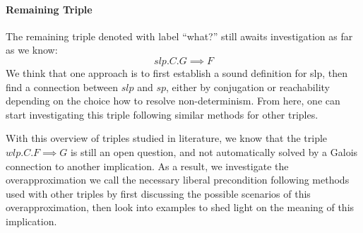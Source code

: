 \paragraph{Remaining Triple}
The remaining triple denoted with label ``what?'' still awaits investigation as far as we know: 
$$slp.C.G\implies F$$
We think that one approach is to first establish a sound definition for slp, then find a connection between $slp$ and $sp$, either by conjugation or reachability depending on the choice how to resolve non-determinism. 
From here, one can start investigating this triple following similar methods for other triples. 

With this overview of triples studied in literature, we know that the triple $wlp.C.F\implies G$ is still an open question, and not automatically solved by a Galois connection to another implication. 
As a result, we investigate the overapproximation we call the necessary liberal precondition following methods used with other triples by first discussing the possible scenarios of this overapproximation, then look into examples to shed light on the meaning of this implication. 



